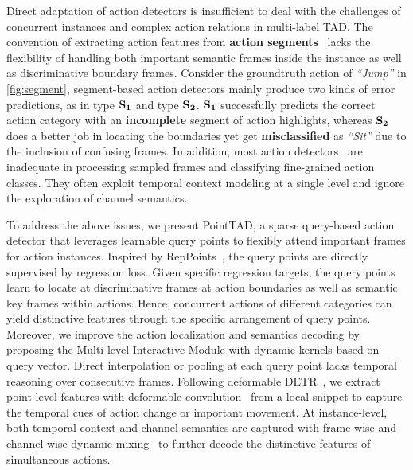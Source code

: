 \documentclass{article}
\begin{document}
Direct adaptation of action detectors is insufficient to deal with the challenges of concurrent instances and complex action relations in multi-label TAD. 
The convention of extracting action features from {\bf action segments}~\cite{DBLP:conf/cvpr/ChaoVSRDS18,DBLP:conf/cvpr/QingSGW0W0YGS21,DBLP:conf/iccv/ZengHGTRZH19,DBLP:journals/corr/abs-2109-08847} lacks the flexibility of handling both important semantic frames inside the instance as well as discriminative boundary frames. Consider the groundtruth action of {\em ``Jump''} in \cref{fig:segment}, segment-based action detectors mainly produce two kinds of error predictions, as in type ${\bf S_1}$ and type ${\bf S_2}$. ${\bf S_1}$ successfully predicts the correct action category with an {\bf incomplete} segment of action highlights, whereas ${\bf S_2}$ does a better job in locating the boundaries yet get {\bf misclassified} as {\em ``Sit''} due to the inclusion of confusing frames.  
In addition, most action detectors~\cite{DBLP:conf/iccv/ZengHGTRZH19,DBLP:conf/cvpr/QingSGW0W0YGS21, DBLP:journals/corr/abs-2106-10271} are inadequate in processing sampled frames and classifying fine-grained action classes. They often exploit temporal context modeling at a single level and ignore the exploration of channel semantics. 

To address the above issues, we present PointTAD, a sparse query-based action detector that leverages learnable query points to flexibly attend important frames for action instances. 
Inspired by RepPoints~\cite{DBLP:conf/iccv/YangLHWL19}, the query points are directly supervised by regression loss. Given specific regression targets, the query points learn to locate at discriminative frames at action boundaries as well as semantic key frames within actions. Hence, concurrent actions of different categories can yield distinctive features through the specific arrangement of query points. Moreover, we improve the action localization and semantics decoding by proposing the Multi-level Interactive Module with dynamic kernels based on query vector. Direct interpolation or pooling at each query point lacks temporal reasoning over consecutive frames. Following deformable DETR~\cite{DBLP:conf/iclr/ZhuSLLWD21}, we extract point-level features with deformable convolution~\cite{DBLP:conf/iccv/DaiQXLZHW17,DBLP:conf/cvpr/ZhuHLD19} from a local snippet to capture the temporal cues of action change or important movement. At instance-level, both temporal context and channel semantics are captured with frame-wise and channel-wise dynamic mixing~\cite{DBLP:conf/cvpr/SunZJKXZTLYW021,DBLP:journals/corr/abs-2203-16507} to further decode the distinctive features of simultaneous actions. 
\end{document}
